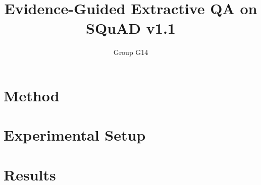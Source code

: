 \documentclass[11pt]{article}
\title{Evidence-Guided Extractive QA on SQuAD v1.1}
\author{Group G14}
\begin{document}
\maketitle

\begin{abstract}

\end{abstract}




\section{Method}
\label{sec:method}





\section{Experimental Setup}
\label{sec:setup}



\section{Results}
\label{sec:results}










\end{document}
